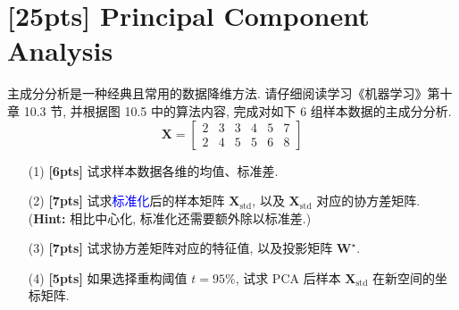 \documentclass[a4paper,UTF8]{article}
\numberwithin{equation}{section}
\theoremstyle{definition}
\def \X {\mathbf{X}}
\def \W {\mathbf{W}}
\begin{document}
\section{[25pts] Principal Component Analysis}
主成分分析是一种经典且常用的数据降维方法. 请仔细阅读学习《机器学习》第十章 10.3 节, 并根据图 10.5 中的算法内容, 完成对如下 6 组样本数据的主成分分析. 
        \[
        \X = \begin{bmatrix}
            2&3&3&4&5&7\\
            2&4&5&5&6&8
        \end{bmatrix}
        \]
        
\begin{enumerate}
    \item[(1)] \textbf{[6pts]} 试求样本数据各维的均值、标准差.
    \item[(2)] \textbf{[7pts]} 试求\textcolor{blue}{标准化}后的样本矩阵 $\X_{\text{std}}$, 以及 $\X_{\text{std}}$ 对应的协方差矩阵.\\
    (\textbf{Hint:} 相比中心化, 标准化还需要额外除以标准差.)
    \item[(3)] \textbf{[7pts]} 试求协方差矩阵对应的特征值, 以及投影矩阵 $\W^\star$. 
    \item[(4)] \textbf{[5pts]} 如果选择重构阈值 $t=95\%$, 试求 PCA 后样本 $\X_{\text{std}}$ 在新空间的坐标矩阵.
\end{enumerate}


 
\end{document}
